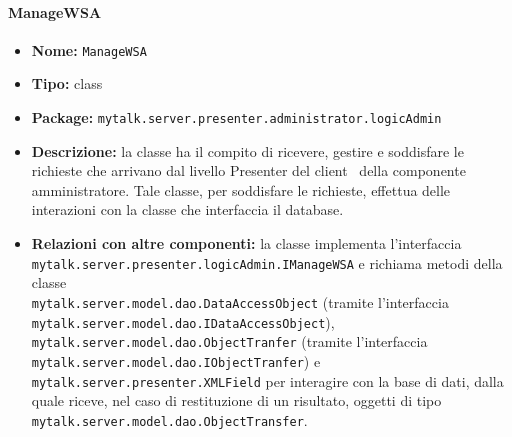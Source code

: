 \paragraph{ManageWSA}{
	\begin{itemize}
		\item [] \textbf{Nome:} \texttt{ManageWSA}
		\item [] \textbf{Tipo:} class
		\item [] \textbf{Package:} \texttt{mytalk.server.presenter.administrator.logicAdmin}
		\item [] \textbf{Descrizione:} la classe ha il compito di ricevere, gestire e soddisfare le richieste che arrivano dal livello Presenter del client\g~ della componente amministratore. Tale classe, per soddisfare le richieste, effettua delle interazioni con la classe che interfaccia il database\g.
		\item [] \textbf{Relazioni con altre componenti:} la classe implementa l'interfaccia\\ \texttt{mytalk.server.presenter.logicAdmin.IManageWSA} e richiama metodi della classe\\ \texttt{mytalk.server.model.dao.DataAccessObject} (tramite l'interfaccia\\ \texttt{mytalk.server.model.dao.IDataAccessObject}), \\ \texttt{mytalk.server.model.dao.ObjectTranfer} (tramite l'interfaccia\\ \texttt{mytalk.server.model.dao.IObjectTranfer}) e\\ \texttt{mytalk.server.presenter.XMLField} per interagire con la base di dati, dalla quale riceve, nel caso di restituzione di un risultato, oggetti di tipo \\ \texttt{mytalk.server.model.dao.ObjectTransfer}.
	\end{itemize}
}

